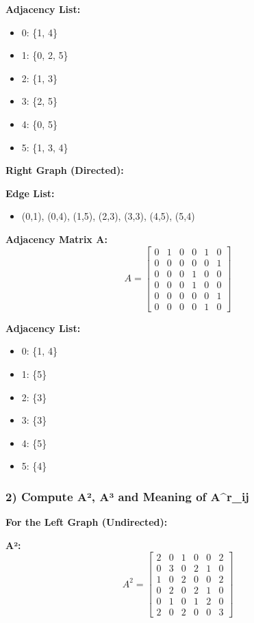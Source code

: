 \documentclass[12pt,a4paper]{article}
\begin{document}
\textbf{Adjacency List:}
\begin{itemize}
    \item 0: \{1, 4\}
    \item 1: \{0, 2, 5\}
    \item 2: \{1, 3\}
    \item 3: \{2, 5\}
    \item 4: \{0, 5\}
    \item 5: \{1, 3, 4\}
\end{itemize}

\textbf{Right Graph (Directed):}

\textbf{Edge List:}
\begin{itemize}
    \item (0,1), (0,4), (1,5), (2,3), (3,3), (4,5), (5,4)
\end{itemize}

\textbf{Adjacency Matrix A:}
\begin{equation}
A = \begin{bmatrix}
0 & 1 & 0 & 0 & 1 & 0 \\
0 & 0 & 0 & 0 & 0 & 1 \\
0 & 0 & 0 & 1 & 0 & 0 \\
0 & 0 & 0 & 1 & 0 & 0 \\
0 & 0 & 0 & 0 & 0 & 1 \\
0 & 0 & 0 & 0 & 1 & 0
\end{bmatrix}
\end{equation}

\textbf{Adjacency List:}
\begin{itemize}
    \item 0: \{1, 4\}
    \item 1: \{5\}
    \item 2: \{3\}
    \item 3: \{3\}
    \item 4: \{5\}
    \item 5: \{4\}
\end{itemize}

\subsubsection{2) Compute A², A³ and Meaning of A^r_ij}

\textbf{For the Left Graph (Undirected):}

\textbf{A²:}
\begin{equation}
A^2 = \begin{bmatrix}
2 & 0 & 1 & 0 & 0 & 2 \\
0 & 3 & 0 & 2 & 1 & 0 \\
1 & 0 & 2 & 0 & 0 & 2 \\
0 & 2 & 0 & 2 & 1 & 0 \\
0 & 1 & 0 & 1 & 2 & 0 \\
2 & 0 & 2 & 0 & 0 & 3
\end{bmatrix}
\end{equation}
\end{document}
